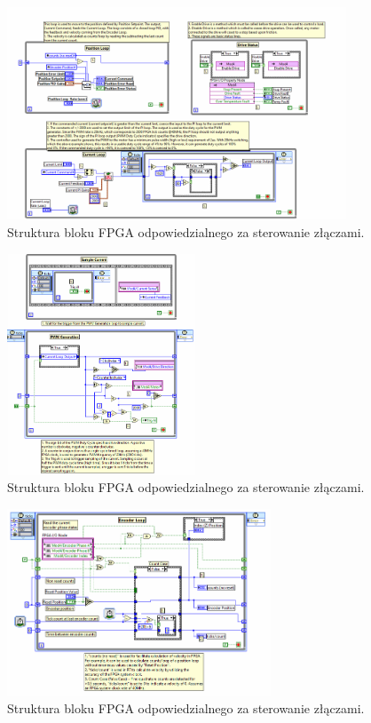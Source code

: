 \documentclass[margin = 2cm]{article}
\begin{document}
	\begin{figure}[H]
		\centering
		\includegraphics[width=0.9\textwidth]{3_3}

		\caption{Struktura bloku FPGA odpowiedzialnego za sterowanie złączami.}
	\end{figure}
	\begin{figure}[H]
		\centering
		\includegraphics[width=0.5\textwidth]{3_4}
		\caption{Struktura bloku FPGA odpowiedzialnego za sterowanie złączami.}
	\end{figure}
	\begin{figure}[H]
		\centering
		\includegraphics[width=0.7\textwidth]{3_5}
		\caption{Struktura bloku FPGA odpowiedzialnego za sterowanie złączami.}
	\end{figure}
\end{document}
